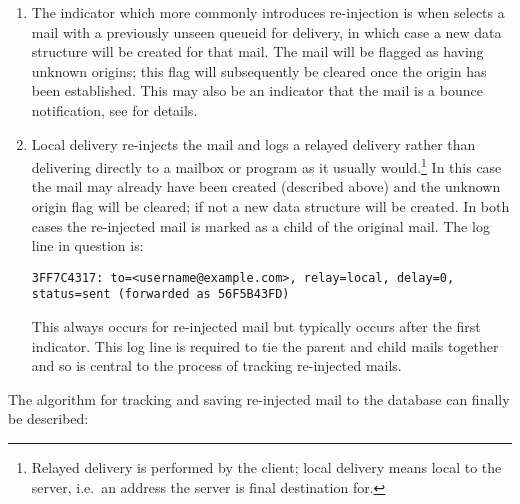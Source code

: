 \begin{enumerate}

    \item The indicator which more commonly introduces re-injection is when
         selects a mail with a previously unseen queueid for
        delivery, in which case a new data structure will be created for
        that mail.  The mail will be flagged as having unknown origins;
        this flag will subsequently be cleared once the origin has been
        established.  This may also be an indicator that the mail is a
        bounce notification, see
         for details.

    \item Local delivery re-injects the mail and logs a relayed delivery
        rather than delivering directly to a mailbox or program as it
        usually would.\footnote{Relayed delivery is performed by the
         client; local delivery means local to the server,
        i.e.\ an address the server is final destination for.}  In this
        case the mail may already have been created (described above) and
        the unknown origin flag will be cleared; if not a new data
        structure will be created.  In both cases the re-injected mail is
        marked as a child of the original mail.  The log line in question
        is:

        \texttt{3FF7C4317: to=<username@example.com>, relay=local,
        \newline{} \tab{} delay=0, status=sent (forwarded as 56F5B43FD)}

        This always occurs for re-injected mail but typically occurs after
        the first indicator.  This log line is required to tie the parent
        and child mails together and so is central to the process of
        tracking re-injected mails.

\end{enumerate}

The algorithm for tracking and saving re-injected mail to the database can
finally be described:

